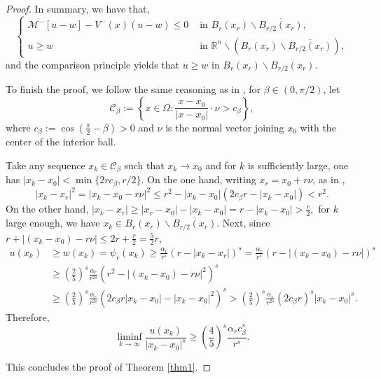 \documentclass[11pt]{article}
\begin{document}
\begin{proof}
In summary, we have that, 
\begin{equation*}
    \begin{cases}
    \mathcal{M}^{-}[u-w] - V^{-}(x)(u - w) \leq 0 & \text{ in } B_{r}(x_r)\backslash\overline{B_{r/2}(x_r)}, \\ 
    u \geq w & \text{ in }\mathbb{R}^{n}\backslash ( B_{r}(x_r)\backslash\overline{B_{r/2}(x_r)} ),
    \end{cases}
    \end{equation*}
and the comparison principle yields that \(u\geq w\) in \(B_{r}(x_r)\backslash\overline{B_{r/2}(x_r)}\).

To finish the proof, we follow the same reasoning as in \cite{dipierro2024fractional}, for $\beta\in(0,\pi/2)$, let 
\begin{equation}
    \mathcal{C}_{\beta} := \left\{x\in\Omega:\dfrac{x-x_0}{|x-x_0|}\cdot\nu >c_{\beta}\right\},
\end{equation}
where $c_{\beta}:=\cos\left(\frac{\pi}{2}-\beta\right)>0$ and $\nu$ is the normal vector joining $x_0$ with the center of the interior ball. 

Take any sequence $x_k\in \mathcal{C}_\beta$ such that $x_k\to x_0$ and for $k$ is sufficiently large, one has $|x_{k}-x_{0}|<\min\{2rc_{\beta}, r/2\}$. On the one hand, writing $x_r=x_0 +r\nu$, as in \cite{dipierro2024fractional},
\begin{equation*}
    |x_k-x_r|^2=|x_k-x_0-r\nu|^2\leq r^2-|x_k-x_0|(2c_\beta r-|x_k-x_0|)<r^2.
\end{equation*}
On the other hand,
$
    |x_k-x_r|\geq |x_r-x_0|-|x_k-x_0|=r-|x_k-x_0|>\frac{r}{2},
$
for $k$ large enough, we have $x_k\in B_{r}(x_r)\backslash \overline{B_{r/2}(x_r)}$. Next, since $r+|(x_k-x_0)-r\nu|\leq 2r + \frac{r}{2}=\frac{5}{2}r$,
\begin{align*}
    u(x_k) &\geq \textstyle w(x_k) 
    = \psi_r(x_{k}) \geq \frac{\alpha_r}{r^s}(r-|x_k-x_r|)^{s} = \frac{\alpha_r}{r^s}(r-|(x_k-x_0)-r\nu|)^{s} \\
    & \textstyle \geq \left(\frac{2}{5}\right)^{s}\frac{\alpha_r}{r^{2s}}(r^2-|(x_k-x_0)-r\nu|^2)^{s} \\
    & \textstyle \geq \left(\frac{2}{5}\right)^{s}\frac{\alpha_r}{r^{2s}}(2c_{\beta}r|x_{k}-x_{0}| -|x_{k}-x_{0}|^{2})^{s} > \left(\frac{2}{5}\right)^{s}\frac{\alpha_r}{r^{2s}}(2c_{\beta}r)^{s} |x_{k}-x_0|^{s}.
\end{align*}
Therefore,
\begin{equation*}
 \textstyle   \liminf_{k\to\infty}\frac{u(x_k)}{|x_k-x_0|^s}\geq\left(\frac{4}{5}\right)^{s}\frac{\alpha_r c_{\beta}^s}{r^s}.
\end{equation*}

This concludes the proof of Theorem \ref{thm1}.
\end{proof}
\end{document}
